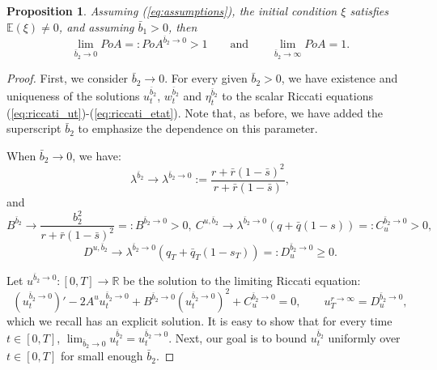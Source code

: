\documentclass[11pt]{article}
\newtheorem{proposition}{Proposition}
\begin{document}
\begin{proposition}
	Assuming (\ref{eq:assumptions}), the initial condition $\xi$ satisfies $\mathbb{E}(\xi)\neq 0$, and assuming $\bar{b}_1> 0$, then 
	\begin{equation*}
	\lim_{\bar{b}_2 \to 0} PoA =: PoA^{\bar{b}_2\to 0} > 1\qquad \text{and} \qquad\lim_{\bar{b}_2 \to \infty} PoA = 1.
	\end{equation*}
	\label{prop:b2bar}
\end{proposition}
\begin{proof}
	First, we consider $\bar{b}_2 \to 0$. For every given $\bar{b}_2 >0$, we have existence and uniqueness of the solutions $u^{\bar{b}_2}_t$, $w^{\bar{b}_2}_t$ and $\eta^{\bar{b}_2}_t$ to the scalar Riccati equations (\ref{eq:riccati_ut})-(\ref{eq:riccati_etat}). Note that, as before, we have added the superscript $\bar{b}_2$ to emphasize the dependence on this parameter.
	
	When $\bar{b}_2 \to 0$, we have:
	$$\displaystyle \lambda^{\bar{b}_2} \to \lambda^{\bar{b}_2 \to 0} := \frac{r + \bar{r}(1- \bar{s})^2}{r + \bar{r}(1-\bar{s})},$$
	and 
	$$B^{\bar{b}_2} \to \frac{b_2^2}{r + \bar{r}(1-\bar{s})^2}=:B^{\bar{b}_2 \to 0} > 0,\ C^{u,\bar{b}_2} \to \lambda^{\bar{b}_2 \to 0}(q+\bar{q}(1-s))=:C^{\bar{b}_2 \to 0}_u >0,$$
	$$D^{u,\bar{b}_2} \to \lambda^{\bar{b}_2 \to 0}(q_T+\bar{q}_T(1-s_T))=:D^{\bar{b}_2 \to 0}_u \geq 0.$$
	
	Let $u^{\bar{b}_2 \to 0}:[0,T]\to \mathbb{R}$ be the solution to the limiting Riccati equation:
	\begin{equation}
	\left({u}^{{\bar{b}_2 \to 0}}_t\right)' - 2A^u u_t^{\bar{b}_2 \to 0} +B^{\bar{b}_2 \to 0} (u_t^{\bar{b}_2 \to 0})^2+ C^{\bar{b}_2 \to 0}_u = 0, \qquad u_T^{r \to \infty} = D^{\bar{b}_2 \to 0}_u,
	\end{equation}
	which we recall has an explicit solution. It is easy to show that for every time $t\in [0,T]$, $\lim_{\bar{b}_2 \to 0}u^{\bar{b}_2}_t=u^{\bar{b}_2 \to 0}_t$. Next, our goal is to bound $u^{\bar{b}_2}_t$ uniformly over $t \in [0,T]$ for small enough $\bar{b}_2$.


\end{proof}
\end{document}

